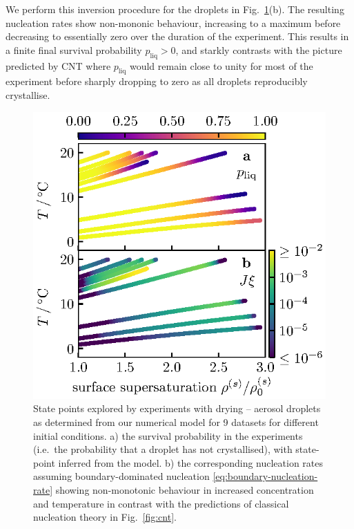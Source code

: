 \documentclass[11pt,twoside]{report}
\begin{document}
We perform this inversion procedure for the  droplets in Fig.\ \ref{fig:state-points}(b).
The resulting nucleation rates show non-mononic behaviour, increasing to a maximum before decreasing to essentially zero over the duration of the experiment.
This results in a finite final survival probability $p_\mathrm{liq} > 0$, and starkly contrasts with the picture predicted by CNT where $p_\mathrm{liq}$ would remain close to unity for most of the experiment before sharply dropping to zero as all droplets reproducibly crystallise.

\begin{figure}
  \includegraphics[width=0.9\linewidth,outer]{nano3-nucleation-rates}
  \caption[Experimentally observed nucleation rates in  droplets]{
    State points explored by experiments with drying -- aerosol droplets as determined from our numerical model for 9 datasets for different initial conditions.
    a) the survival probability in the experiments (i.e.\ the probability that a droplet has not crystallised), with state-point inferred from the model.
    b) the corresponding nucleation rates assuming boundary-dominated nucleation \eqref{eq:boundary-nucleation-rate} showing non-monotonic behaviour in increased concentration and temperature in contrast with the predictions of classical nucleation theory in Fig.\ \ref{fig:cnt}.}
  \label{fig:state-points}
\end{figure}
\end{document}
